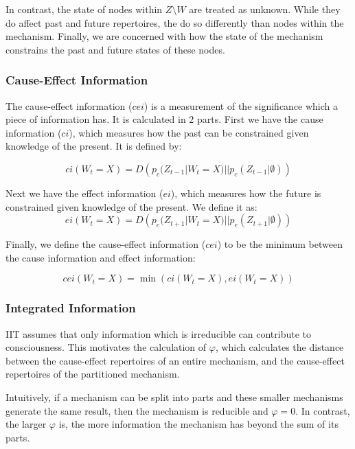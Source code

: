 In contrast, the state of nodes within $Z \setminus W$ are treated as unknown. While they do affect past and future repertoires, the do so differently than nodes within the mechanism. Finally, we are concerned with how the state of the mechanism constrains the past and future states of these nodes.

\subsubsection{Cause-Effect Information}
The cause-effect information ($cei$) is a measurement of the significance which a piece of information has. It is calculated in 2 parts. First we have the cause information ($ci$), which measures how the past can be constrained given knowledge of the present. It is defined by:

\begin{equation}
\label{def:ci}
ci(W_{t} = X) = D\left(p_c(Z_{t-1}|W_{t} = X)||p_c(Z_{t-1}|\emptyset)\right)
\end{equation}


Next we have the effect information ($ei$), which measures how the future is constrained given knowledge of the present. We define it as:
\begin{equation}
\label{def:ei}
ei(W_{t} = X) = D\left(p_e(Z_{t+1}|W_{t} = X)||p_{e}(Z_{t+1}|\emptyset)\right)
\end{equation}

Finally, we define the cause-effect information ($cei$) to be the minimum between the cause information and effect information:

\begin{equation}
\label{def:cei}
cei(W_{t} = X) = \min\left(ci(W_{t} = X), ei(W_{t} = X) \right)
\end{equation}

\subsubsection{Integrated Information}
\label{sec:mech_integration}
IIT assumes that only information which is irreducible can contribute to consciousness. This motivates the calculation of $\varphi$, which calculates the distance between the cause-effect repertoires of an entire mechanism, and the cause-effect repertoires of the partitioned mechanism. 

Intuitively, if a mechanism can be split into parts and these smaller mechanisms generate the same result, then the mechanism is reducible and $\varphi=0$. In contrast, the larger $\varphi$ is, the more information the mechanism has beyond the sum of its parts.

